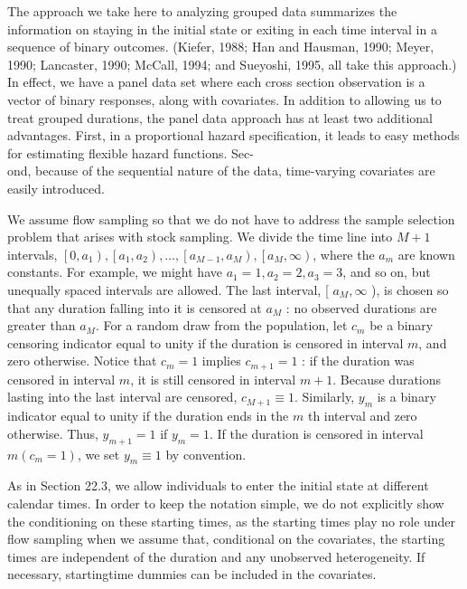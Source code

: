 \documentclass[10pt]{article}
\begin{document}
The approach we take here to analyzing grouped data summarizes the information on staying in the initial state or exiting in each time interval in a sequence of binary outcomes. (Kiefer, 1988; Han and Hausman, 1990; Meyer, 1990; Lancaster, 1990; McCall, 1994; and Sueyoshi, 1995, all take this approach.) In effect, we have a panel data set where each cross section observation is a vector of binary responses, along with covariates. In addition to allowing us to treat grouped durations, the panel data approach has at least two additional advantages. First, in a proportional hazard specification, it leads to easy methods for estimating flexible hazard functions. Sec-\\
ond, because of the sequential nature of the data, time-varying covariates are easily introduced.

We assume flow sampling so that we do not have to address the sample selection problem that arises with stock sampling. We divide the time line into $M+1$ intervals, $\left[0, a_{1}\right),\left[a_{1}, a_{2}\right), \ldots,\left[a_{M-1}, a_{M}\right),\left[a_{M}, \infty\right)$, where the $a_{m}$ are known constants. For example, we might have $a_{1}=1, a_{2}=2, a_{3}=3$, and so on, but unequally spaced intervals are allowed. The last interval, [ $a_{M}, \infty$ ), is chosen so that any duration falling into it is censored at $a_{M}$ : no observed durations are greater than $a_{M}$. For a random draw from the population, let $c_{m}$ be a binary censoring indicator equal to unity if the duration is censored in interval $m$, and zero otherwise. Notice that $c_{m}=1$ implies $c_{m+1}=1$ : if the duration was censored in interval $m$, it is still censored in interval $m+1$. Because durations lasting into the last interval are censored, $c_{M+1} \equiv 1$. Similarly, $y_{m}$ is a binary indicator equal to unity if the duration ends in the $m$ th interval and zero otherwise. Thus, $y_{m+1}=1$ if $y_{m}=1$. If the duration is censored in interval $m\left(c_{m}=1\right)$, we set $y_{m} \equiv 1$ by convention.

As in Section 22.3, we allow individuals to enter the initial state at different calendar times. In order to keep the notation simple, we do not explicitly show the conditioning on these starting times, as the starting times play no role under flow sampling when we assume that, conditional on the covariates, the starting times are independent of the duration and any unobserved heterogeneity. If necessary, startingtime dummies can be included in the covariates.
\end{document}

